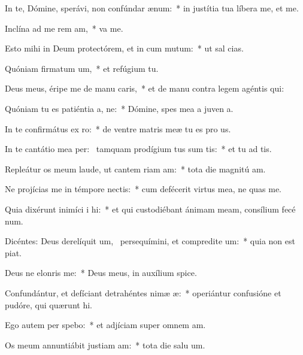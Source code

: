 \item In te, Dómine, sperávi, non confúndar  ænum:~* in justítia tua líbera me, et  me.
\item Inclína ad me rem am,~*  va me.
\item Esto mihi in Deum protectórem, et in cum mutum:~* ut sal  cias.
\item Quóniam firmatum um,~* et refúgium   tu.
\item Deus meus, éripe me de manu caris,~* et de manu contra legem agéntis  qui:
\item Quóniam tu es patiéntia a, ne:~* Dómine, spes mea a juven a.
\item In te confirmátus  ex ro:~* de ventre matris meæ tu es pro us.
\item In te cantátio mea per:~\pscross{} tamquam prodígium tus sum tis:~* et tu ad tis.
\item Repleátur os meum laude, ut cantem riam am:~* tota die magnitú am.
\item Ne projícias me in témpore nectis:~* cum defécerit virtus mea, ne quas me.
\item Quia dixérunt inimíci i hi:~* et qui custodiébant ánimam meam, consílium fecé  num.
\item Dicéntes: Deus derelíquit um,~\pscross{} persequímini, et compredite um:~* quia non est  piat.
\item Deus ne elonris  me:~* Deus meus, in auxílium  spice.
\item Confundántur, et defíciant detrahéntes nimæ æ:~* operiántur confusióne et pudóre, qui quærunt  hi.
\item Ego autem per spebo:~* et adjíciam super omnem  am.
\item Os meum annuntiábit justiam am:~* tota die salu um.
